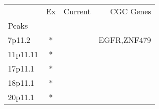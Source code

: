 \begin{tabular}{lccr}
\toprule
{} & Ex & Current &    CGC Genes \\
Peaks    &    &         &              \\
\midrule
7p11.2   &  * &         &  EGFR,ZNF479 \\
11p11.11 &  * &         &              \\
17p11.1  &  * &         &              \\
18p11.1  &  * &         &              \\
20p11.1  &  * &         &              \\
\bottomrule
\end{tabular}

